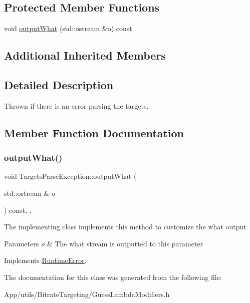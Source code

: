 \subsection*{Protected Member Functions}
\begin{DoxyCompactItemize}
\item 
void \hyperlink{class_targets_parse_exception_a8a1d505082502689960f60572ca4238a}{output\+What} (std\+::ostream \&o) const
\end{DoxyCompactItemize}
\subsection*{Additional Inherited Members}


\subsection{Detailed Description}
Thrown if there is an error parsing the targets. 

\subsection{Member Function Documentation}
\mbox{\label{class_targets_parse_exception_a8a1d505082502689960f60572ca4238a}} 
\subsubsection{\texorpdfstring{output\+What()}{outputWhat()}}
{\footnotesize\ttfamily void Targets\+Parse\+Exception\+::output\+What (\begin{DoxyParamCaption}\item[{std\+::ostream \&}]{o }\end{DoxyParamCaption}) const\hspace{0.3cm}{\ttfamily [inline]}, {\ttfamily [protected]}, {\ttfamily [virtual]}}

The implementing class implements this method to customize the what output 
\begin{DoxyParams}{Parameters}
{\em o} & The what stream is outputted to this parameter \\
\hline
\end{DoxyParams}


Implements \hyperlink{class_runtime_error_a5020b04a2a7fac8b1dbfbfe4a30055b0}{Runtime\+Error}.



The documentation for this class was generated from the following file\+:\begin{DoxyCompactItemize}
\item 
App/utils/\+Bitrate\+Targeting/Guess\+Lambda\+Modifiers.\+h\end{DoxyCompactItemize}

